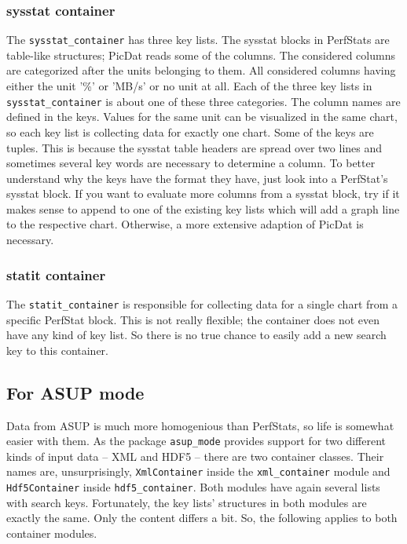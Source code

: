 \documentclass[a4paper,11pt]{article}
\begin{document}
\subsubsection*{sysstat container}
The \verb|sysstat_container| has three key lists. The sysstat blocks in PerfStats are table-like structures; PicDat reads some of the columns. The considered columns are categorized after the units belonging to them. All considered columns having either the unit '\%' or 'MB/s' or no unit at all. Each of the three key lists in \verb|sysstat_container| is about one of these three categories. The column names are defined in the keys. Values for the same unit can be visualized in the same chart, so each key list is collecting data for exactly one chart. Some of the keys are tuples. This is because the sysstat table headers are spread over two lines and sometimes several key words are necessary to determine a column. To better understand why the keys have the format they have, just look into a PerfStat's sysstat block. If you want to evaluate more columns from a sysstat block, try if it makes sense to append to one of the existing key lists which will add a graph line to the respective chart. Otherwise, a more extensive adaption of PicDat is necessary.

\subsubsection*{statit container}
The \verb|statit_container| is responsible for collecting data for a single chart from a specific PerfStat block. This is not really flexible; the container does not even have any kind of key list. So there is no true chance to easily add a new search key to this container.

\subsection*{For ASUP mode}
Data from ASUP is much more homogenious than PerfStats, so life is somewhat easier with them. As the package \verb|asup_mode| provides support for two different kinds of input data -- XML and HDF5 -- there are two container classes. Their names are, unsurprisingly, \verb|XmlContainer| inside the \verb|xml_container| module and \verb|Hdf5Container| inside \verb|hdf5_container|. Both modules have again several lists with search keys. Fortunately, the key lists' structures in both modules are exactly the same. Only the content differs a bit. So, the following applies to both container modules.
\end{document}

